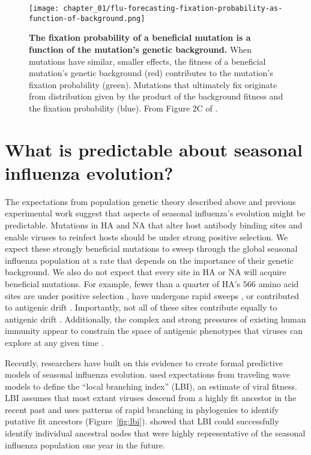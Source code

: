 \begin{figure}
  \centering
  \texttt{[image: chapter\_01/flu-forecasting-fixation-probability-as-function-of-background.png]}
  \caption[{The fixation probability of a beneficial mutation is a function of the mutation's genetic background.}]{{\bf The fixation probability of a beneficial mutation is a function of the mutation's genetic background.}
    When mutations have similar, smaller effects, the fitness of a beneficial mutation's genetic background (red) contributes to the mutation's fixation probability (green).
    Mutations that ultimately fix originate from distribution given by the product of the background fitness and the fixation probability (blue).
    From Figure 2C of \citet{Neher2013}.\label{fig:fixation-probability-as-function-of-background} }
\end{figure}

\section{What is predictable about seasonal influenza evolution?}

The expectations from population genetic theory described above and previous experimental work suggest that aspects of seasonal influenza's evolution might be predictable.
Mutations in HA and NA that alter host antibody binding sites and enable viruses to reinfect hosts should be under strong positive selection.
We expect these strongly beneficial mutations to sweep through the global seasonal influenza population at a rate that depends on the importance of their genetic background.
We also do not expect that every site in HA or NA will acquire beneficial mutations.
For example, fewer than a quarter of HA's 566 amino acid sites are under positive selection \citep{Bush:1999vj}, have undergone rapid sweeps \citep{Shih:2007bd}, or contributed to antigenic drift \citep{Wolf:2006da}.
Importantly, not all of these sites contribute equally to antigenic drift \citep{Koel:2013jz}.
Additionally, the complex and strong pressures of existing human immunity appear to constrain the space of antigenic phenotypes that viruses can explore at any given time \citep{Smith:2004jc,Bedford2012}.

Recently, researchers have built on this evidence to create formal predictive models of seasonal influenza evolution.
\citet{Neher:2014eu} used expectations from traveling wave models to define the ``local branching index'' (LBI), an estimate of viral fitness.
LBI assumes that most extant viruses descend from a highly fit ancestor in the recent past and uses patterns of rapid branching in phylogenies to identify putative fit ancestors (Figure~\ref{fig:lbi}).
\citet{Neher:2014eu} showed that LBI could successfully identify individual ancestral nodes that were highly representative of the seasonal influenza population one year in the future.


